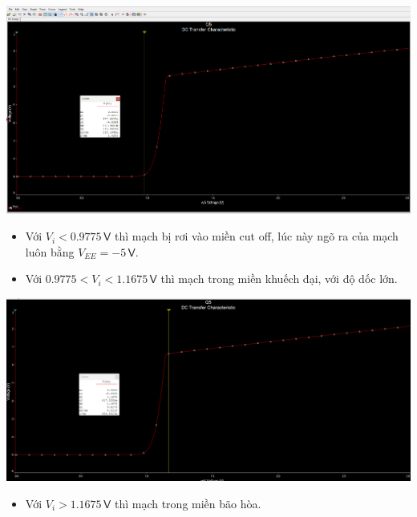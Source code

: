 \begin{minipage}{0.4\linewidth}
	\includegraphics[width=\linewidth]{./my-chapters/my-images/Question5/a_cutoff.png}
\end{minipage}
\begin{minipage}{0.5\linewidth}
	\begin{itemize}[label=-]
		\item Với $V_{i} < 0.9775\,\textsf{V}$ thì mạch bị rơi vào miền cut off, lúc này ngõ ra của mạch luôn bằng $V_{EE} = -5\,\textsf{V}$.
		
		\item Với $0.9775 < V_{i} < 1.1675\,\textsf{V}$ thì mạch trong miền khuếch đại, với độ dốc lớn.
	\end{itemize}
\end{minipage}

\begin{minipage}{0.4\linewidth}
	\includegraphics[width=\linewidth]{./my-chapters/my-images/Question5/a_linear.png}
\end{minipage}
\begin{minipage}{0.5\linewidth}
	\begin{itemize}[label=-]
		\item Với $V_{i} > 1.1675\,\textsf{V}$ thì mạch trong miền bão hòa.
	\end{itemize}
\end{minipage}

